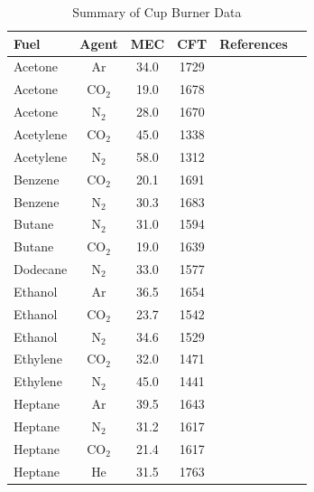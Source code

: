 \begin{table}[p]
\caption{Summary of Cup Burner Data}
\label{Cup_Table}
\small
\begin{tabular}{|l|c|c|c|c|l|}
\hline
Fuel       &  Agent  & MEC  & CFT  & References   \\ \hline \hline
Acetone    & Ar      & 34.0 & 1729 & \cite{Tapscott:1,Moore:1}  \\ \hline
Acetone    & CO$_2$  & 19.0 & 1678 & \cite{Yamamoto:1}  \\ \hline
Acetone    & N$_2$   & 28.0 & 1670 & \cite{Tapscott:1,Yamamoto:1}  \\ \hline
Acetylene  & CO$_2$  & 45.0 & 1338 & \cite{Yamamoto:1}  \\ \hline
Acetylene  & N$_2$   & 58.0 & 1312 & \cite{Yamamoto:1}  \\ \hline
Benzene    & CO$_2$  & 20.1 & 1691 & \cite{Yamamoto:1,Sakei:1}  \\ \hline
Benzene    & N$_2$   & 30.3 & 1683 & \cite{Tapscott:1,Yamamoto:1,Sakei:1}  \\ \hline
Butane     & N$_2$   & 31.0 & 1594 & \cite{Yamamoto:1}  \\ \hline
Butane     & CO$_2$  & 19.0 & 1639 & \cite{Yamamoto:1}  \\ \hline
Dodecane   & N$_2$   & 33.0 & 1577 & \cite{Tapscott:1}  \\ \hline
Ethanol    & Ar      & 36.5 & 1654 & \cite{Tapscott:1,Moore:1}  \\ \hline
Ethanol    & CO$_2$  & 23.7 & 1542 & \cite{Yamamoto:1,Sakei:1}  \\ \hline
Ethanol    & N$_2$   & 34.6 & 1529 & \cite{Tapscott:1,Yamamoto:1,Sakei:1}  \\ \hline
Ethylene   & CO$_2$  & 32.0 & 1471 & \cite{Yamamoto:1}  \\ \hline
Ethylene   & N$_2$   & 45.0 & 1441 & \cite{Yamamoto:1}  \\ \hline
Heptane    & Ar      & 39.5 & 1643 & \cite{Tapscott:1,Bogdan:1,Moore:1,Sheinson:FSJ,Grosshandler:Cup,Saito:FSJ,NFPA_2001,ISO_14520,Senecal:FSJ}  \\ \hline
Heptane    & N$_2$   & 31.2 & 1617 & \cite{Tapscott:1,Bogdan:1,Hamins:CS1998,Moore:1,Hirst:1,Sheinson:FSJ,Grosshandler:Cup,Saito:FSJ,Yamamoto:1,Sakei:1,NFPA_2001,ISO_14520,Senecal:FSJ}  \\ \hline
Heptane    & CO$_2$  & 21.4 & 1617 & \cite{Moore:1,Hirst:1,Sheinson:FSJ,Grosshandler:Cup,Saito:FSJ,Yamamoto:1,Sakei:1}  \\ \hline
Heptane    & He      & 31.5 & 1763 & \cite{Sheinson:FSJ,Grosshandler:Cup}  \\ \hline

\end{tabular}
\end{table}
